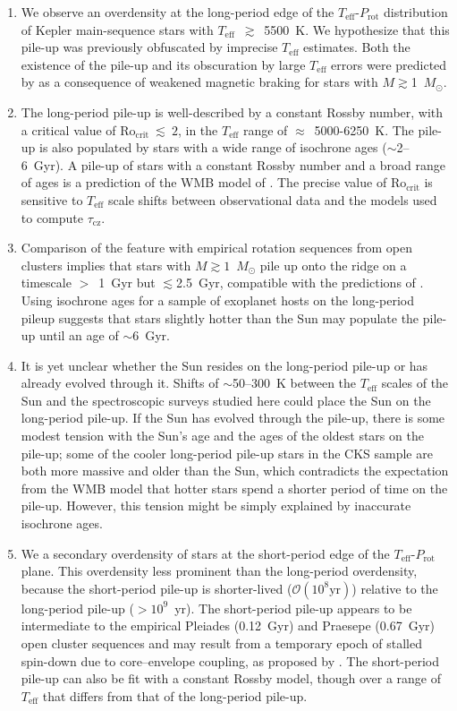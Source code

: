 \documentclass[linenumbers,trackchanges,twocolumn]{aastex631}
\newcommand{\taucz}{$\tau_\mathrm{cz}$\xspace}
\newcommand{\rocrit}{$\mathrm{Ro_{crit}}$\xspace}
\newcommand{\rocritfinal}{$\mathrm{Ro_{crit}}~\lesssim~2$\xspace}
\newcommand{\teffmin}{5500~K\xspace}
\newcommand{\agerange}{$\sim$2--6~Gyr\xspace}
\newcommand{\teff}{\ensuremath{T_{\mathrm{eff}}}\xspace}
\newcommand{\msun}{$M_\odot$\xspace}
\newcommand{\prot}{\ensuremath{P_\mathrm{rot}}\xspace}
\begin{document}
\begin{enumerate}
    \item We observe an overdensity at the long-period edge of the \teff-\prot distribution of Kepler main-sequence stars with \teff~$\gtrsim$~\teffmin. We hypothesize that this pile-up was previously obfuscated by imprecise \teff estimates. Both the existence of the pile-up and its obscuration by large \teff errors were predicted by \citet{vanSaders2019} as a consequence of weakened magnetic braking for stars with $M\gtrsim$1~\msun. 
    
    \item The long-period pile-up is well-described by a constant Rossby number, with a critical value of \rocritfinal, in the \teff range of $\approx$~5000-6250~K. The pile-up is also populated by stars with a wide range of isochrone ages (\agerange). A pile-up of stars with a constant Rossby number and a broad range of ages is a prediction of the WMB model of \citet{vanSaders2016, vanSaders2019}. The precise value of \rocrit is sensitive to \teff scale shifts between observational data and the models used to compute \taucz. 

    \item Comparison of the feature with empirical rotation sequences from open clusters implies that stars with $M\gtrsim1$~\msun pile up onto the ridge on a timescale $>$~1~Gyr but $\lesssim$2.5~Gyr, compatible with the predictions of \citet{vanSaders2019}. Using isochrone ages for a sample of exoplanet hosts on the long-period pileup suggests that stars slightly hotter than the Sun may populate the pile-up until an age of $\sim$6~Gyr.
    
    \item It is yet unclear whether the Sun resides on the long-period pile-up or has already evolved through it. Shifts of $\sim$50--300~K between the \teff scales of the Sun and the spectroscopic surveys studied here could place the Sun on the long-period pile-up. If the Sun has evolved through the pile-up, there is some modest tension with the Sun's age and the ages of the oldest stars on the pile-up; some of the cooler long-period pile-up stars in the CKS sample are both more massive and older than the Sun, which contradicts the expectation from the WMB model that hotter stars spend a shorter period of time on the pile-up. However, this tension might be simply explained by inaccurate isochrone ages.
    
    \item We  a secondary overdensity of stars at the short-period edge of the \teff-\prot plane. This overdensity  less prominent than the long-period overdensity,  because the short-period pile-up is shorter-lived ($\mathcal{O}(10^8 \text{yr})$) relative to the long-period pile-up ($>10^9$~yr). The short-period pile-up appears to be intermediate to the empirical Pleiades (0.12~Gyr) and Praesepe (0.67~Gyr) open cluster sequences and may result from a temporary epoch of stalled spin-down due to core–envelope coupling, as proposed by \citet{Curtis2020}. The short-period pile-up can also be fit with a constant Rossby model, though over a range of \teff that differs from that of the long-period pile-up.
    

\end{enumerate}
\end{document}
